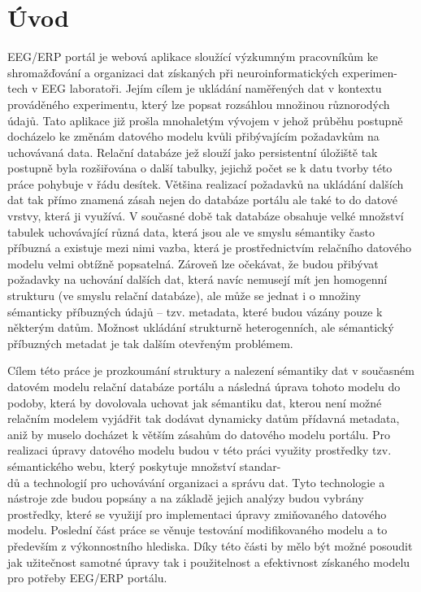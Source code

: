 \documentclass{projekt}
\begin{document}
\chapter{Úvod}
\hspace{0.65cm}EEG/ERP portál je webová aplikace sloužící výzkumným pracovníkům ke shromažďování a organizaci dat získaných při neuroinformatických experimen-\\tech v EEG laboratoři. Jejím cílem je ukládání naměřených dat v kontextu prováděného experimentu, který lze popsat rozsáhlou množinou různorodých údajů. Tato aplikace již prošla mnohaletým vývojem v jehož průběhu postupně docházelo ke změnám datového modelu kvůli přibývajícím požadavkům na uchovávaná data. Relační databáze jež slouží jako persistentní úložiště tak postupně byla rozšiřována o další tabulky, jejichž počet se k datu tvorby této práce pohybuje v řádu desítek. Většina realizací požadavků na ukládání dalších dat tak přímo znamená zásah nejen do databáze portálu ale také to do datové vrstvy, která ji využívá. V současné době tak databáze obsahuje velké množství tabulek uchovávající různá data, která jsou ale ve smyslu sémantiky často příbuzná a existuje mezi nimi vazba, která je prostřednictvím relačního datového modelu velmi obtížně popsatelná. Zároveň lze očekávat, že budou přibývat požadavky na uchování dalších dat, která navíc nemusejí mít jen homogenní strukturu (ve smyslu relační databáze), ale může se jednat i o množiny sémanticky příbuzných údajů – tzv. metadata, které budou vázány pouze k některým datům. Možnost ukládání strukturně heterogenních, ale sémantický příbuzných metadat je tak dalším otevřeným problémem.

Cílem této práce je prozkoumání struktury a nalezení sémantiky dat v současném datovém modelu relační databáze portálu a následná úprava tohoto modelu do podoby, která by dovolovala uchovat jak sémantiku dat, kterou není možné relačním modelem vyjádřit tak dodávat dynamicky datům přídavná metadata, aniž by muselo docházet k větším zásahům do datového modelu portálu. Pro realizaci úpravy datového modelu budou v této práci využity prostředky tzv. sémantického webu, který poskytuje množství standar-\\dů a technologií pro uchovávání organizaci a správu dat. Tyto technologie a nástroje zde budou popsány a na základě jejich analýzy budou vybrány prostředky, které se využijí pro implementaci úpravy zmiňovaného datového modelu. 
Poslední část práce se věnuje testování modifikovaného modelu a to především z výkonnostního hlediska. Díky této části by mělo být možné posoudit jak užitečnost samotné úpravy tak i použitelnost a efektivnost získaného modelu pro potřeby EEG/ERP portálu.
\end{document}
